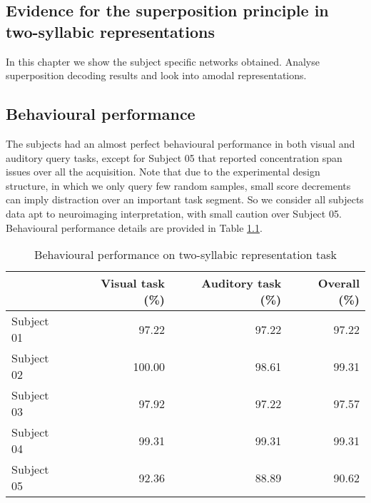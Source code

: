 \begin{fullwidth}
\chapter{\label{ch:super_syllables}
Evidence for the superposition principle in two-syllabic representations}
\end{fullwidth}

\begin{chabstract}

In this chapter we show the subject specific networks obtained. Analyse superposition decoding results and look into amodal representations.

\end{chabstract}





\section{Behavioural performance}
%
The subjects had an almost perfect behavioural performance in both visual and auditory query tasks, except for Subject 05 that reported concentration span issues over all the acquisition.
Note that due to the experimental design structure, in which we only query few random samples, small score decrements can imply distraction over an important task segment.
So we consider all subjects data apt to neuroimaging interpretation, with small caution over Subject 05. Behavioural performance details are provided in Table \ref{table:behaviour}.


\begin{table}
\begin{tabular}{lrrr}
\toprule
{} &  Visual task (\%) &  Auditory task (\%) &  Overall (\%) \\
\midrule
Subject 01 &        97.22 &          97.22 &    97.22 \\
Subject 02 &       100.00 &          98.61 &    99.31 \\
Subject 03 &        97.92 &          97.22 &    97.57 \\
Subject 04 &        99.31 &          99.31 &    99.31 \\
Subject 05 &        92.36 &          88.89 &    90.62 \\
\bottomrule
\end{tabular}
\caption{Behavioural performance on two-syllabic representation task}
\label{table:behaviour}
\end{table}


